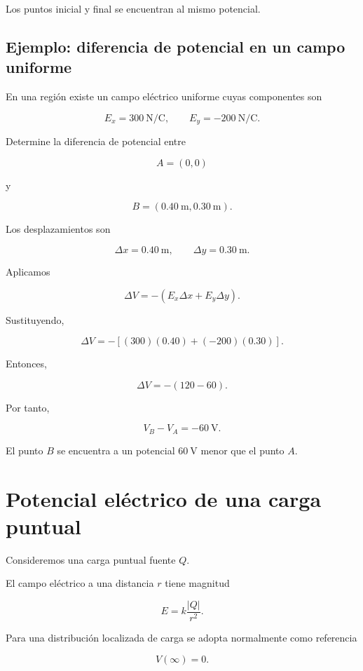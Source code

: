 Los puntos inicial y final se encuentran al mismo potencial.


\subsection{Ejemplo: diferencia de potencial en un campo uniforme}

\begin{ejemplo}

En una región existe un campo eléctrico uniforme cuyas componentes son

\[
E_x=\SI{300}{\newton\per\coulomb},
\qquad
E_y=-\SI{200}{\newton\per\coulomb}.
\]

Determine la diferencia de potencial entre

\[
A=(0,0)
\]

y

\[
B=(\SI{0.40}{\metre},\SI{0.30}{\metre}).
\]

\end{ejemplo}

Los desplazamientos son

\[
\Delta x=\SI{0.40}{\metre},
\qquad
\Delta y=\SI{0.30}{\metre}.
\]

Aplicamos

\[
\Delta V
=
-(E_x\Delta x+E_y\Delta y).
\]

Sustituyendo,

\[
\Delta V
=
-\left[
(300)(0.40)+(-200)(0.30)
\right].
\]

Entonces,

\[
\Delta V=-(120-60).
\]

Por tanto,

\[
\boxed{
V_B-V_A=-\SI{60}{\volt}
}.
\]

El punto \(B\) se encuentra a un potencial \(\SI{60}{\volt}\) menor que el punto
\(A\).


\section{Potencial eléctrico de una carga puntual}

Consideremos una carga puntual fuente \(Q\).

El campo eléctrico a una distancia \(r\) tiene magnitud

\[
E=k\frac{|Q|}{r^2}.
\]

Para una distribución localizada de carga se adopta normalmente como referencia

\[
V(\infty)=0.
\]

